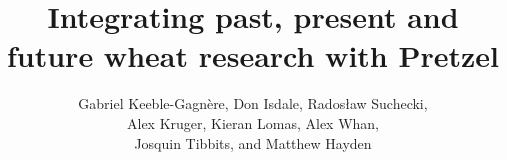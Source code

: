 \documentclass[10pt,a4paper]{article}
\title{Integrating past, present and future wheat research with Pretzel}
\author{Gabriel Keeble-Gagn\`ere,
Don Isdale,
Rados{\l}aw Suchecki,\\
Alex Kruger,
Kieran Lomas,
Alex Whan,\\
Josquin Tibbits,
and Matthew Hayden}
\begin{document}
\maketitle

\begin{abstract}
\noindent

\end{abstract}


\end{document}
